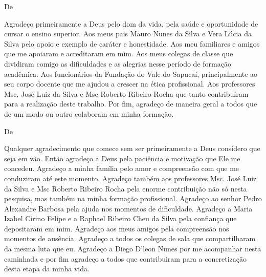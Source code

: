 \begin{agradecimentos}

De \imprimirAutorUm
\newline
	\par Agradeço primeiramente a Deus pelo dom da vida, pela saúde e oportunidade
de cursar o ensino superior. Aos meus pais Mauro Nunes da Silva e Vera Lúcia da
Silva pelo apoio e exemplo de caráter e honestidade. Aos meu familiares e
amigos que me apoiaram e acreditaram em mim. Aos meus colegas de classe que
dividiram comigo as dificuldades e as alegrias nesse período de formação
acadêmica. Aos funcionários da Fundação do Vale do Sapucaí, principalmente ao
seu corpo docente que me ajudou a crescer na ética profissional. Aos
professores Msc. José Luiz da Silva e Msc Roberto Ribeiro Rocha que tanto
contribuíram para a realização deste trabalho. Por fim, agradeço de maneira
geral a todos que de um modo ou outro colaboram em minha formação.

\vspace*{\fill}
De \imprimirAutorDois
\newline
	\par Qualquer agradecimento que comece sem ser primeiramente a Deus considero
que seja em vão. Então agradeço a Deus pela paciência e motivação que Ele me
concedeu. Agradeço a minha família pelo amor e compreensão com que me conduziram
até este momento. Agradeço também aos professores Msc. José Luiz da Silva e Msc
Roberto Ribeiro Rocha pela enorme contribuição não só nesta pesquisa, mas também
na minha formação profissional. Agradeço ao senhor Pedro Alexandre Barbosa pela
ajuda nos momentos de dificuldade. Agradeço a Maria Izabel Cirino Felipe e a
Raphael Ribeiro Cheu da Silva pela confiança que depositaram em mim. Agradeço
aos meus amigos pela compreensão nos momentos de ausência. Agradeço a todos os
colegas de sala que compartilharam da mesma luta que eu. Agradeço a Diego
D'leon Nunes por me acompanhar nesta caminhada e por fim agradeço a todos que
contribuiram para a concretização desta etapa da minha vida.

\end{agradecimentos}




